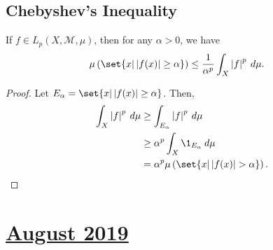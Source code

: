 \documentclass[10pt]{mypackage}
\begin{document}
\subsection{Chebyshev's Inequality}%
\begin{theorem}
  If $f\in L_p\left(X,\mathcal{M},\mu\right)$, then for any $\alpha > 0$, we have
  \begin{align*}
    \mu\left(\set{x | \left\vert f(x)\right\vert \geq \alpha}\right) &\leq \frac{1}{\alpha^{p}} \int_{X}^{} \left\vert f \right\vert^{p}\:d\mu.
  \end{align*}
\end{theorem}
\begin{proof}
  Let $E_{\alpha} = \set{x | \left\vert f(x) \right\vert \geq \alpha}$. Then,
  \begin{align*}
    \int_{X}^{} \left\vert f \right\vert^{p}\:d\mu &\geq \int_{E_{\alpha}}^{} \left\vert f \right\vert^{p}\:d\mu\\
                                                   &\geq \alpha^{p} \int_{X}^{} \1_{E_{\alpha}}\:d\mu\\
                                                   &= \alpha^{p} \mu\left( \set{x | \left\vert f(x) \right\vert > \alpha} \right).
  \end{align*}
\end{proof}
\section{\href{https://math.virginia.edu/graduate/exams/analysis/2019Aug_real.pdf}{August 2019}}%
\end{document}
